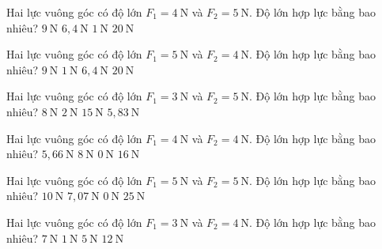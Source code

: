 \begin{ex}
Hai lực vuông góc có độ lớn $F_1=4\ \mathrm{N}$ và $F_2=5\ \mathrm{N}$. Độ lớn hợp lực bằng bao nhiêu?
\choice
{$9\ \mathrm{N}$}
{\True $6,4\ \mathrm{N}$}
{$1\ \mathrm{N}$}
{$20\ \mathrm{N}$}
\end{ex}

\begin{ex}
Hai lực vuông góc có độ lớn $F_1=5\ \mathrm{N}$ và $F_2=4\ \mathrm{N}$. Độ lớn hợp lực bằng bao nhiêu?
\choice
{$9\ \mathrm{N}$}
{$1\ \mathrm{N}$}
{\True $6,4\ \mathrm{N}$}
{$20\ \mathrm{N}$}
\end{ex}

\begin{ex}
Hai lực vuông góc có độ lớn $F_1=3\ \mathrm{N}$ và $F_2=5\ \mathrm{N}$. Độ lớn hợp lực bằng bao nhiêu?
\choice
{$8\ \mathrm{N}$}
{$2\ \mathrm{N}$}
{$15\ \mathrm{N}$}
{\True $5,83\ \mathrm{N}$}
\end{ex}

\begin{ex}
Hai lực vuông góc có độ lớn $F_1=4\ \mathrm{N}$ và $F_2=4\ \mathrm{N}$. Độ lớn hợp lực bằng bao nhiêu?
\choice
{\True $5,66\ \mathrm{N}$}
{$8\ \mathrm{N}$}
{$0\ \mathrm{N}$}
{$16\ \mathrm{N}$}
\end{ex}

\begin{ex}
Hai lực vuông góc có độ lớn $F_1=5\ \mathrm{N}$ và $F_2=5\ \mathrm{N}$. Độ lớn hợp lực bằng bao nhiêu?
\choice
{$10\ \mathrm{N}$}
{\True $7,07\ \mathrm{N}$}
{$0\ \mathrm{N}$}
{$25\ \mathrm{N}$}
\end{ex}

\begin{ex}
Hai lực vuông góc có độ lớn $F_1=3\ \mathrm{N}$ và $F_2=4\ \mathrm{N}$. Độ lớn hợp lực bằng bao nhiêu?
\choice
{$7\ \mathrm{N}$}
{$1\ \mathrm{N}$}
{\True $5\ \mathrm{N}$}
{$12\ \mathrm{N}$}
\end{ex}

